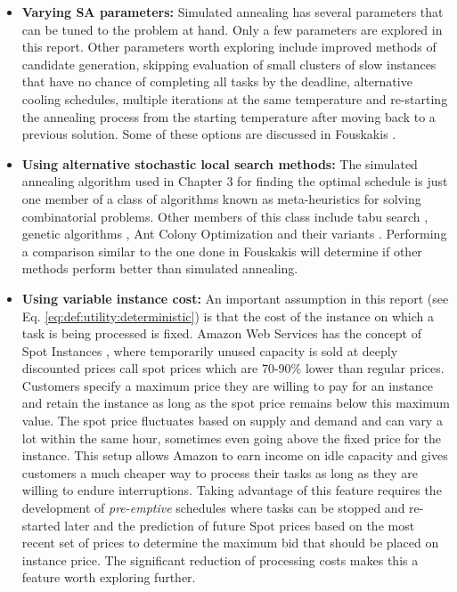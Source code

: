 \documentclass[12pt]{report}
\begin{document}
\begin{itemize}

	\item \textbf{Varying SA parameters:} Simulated annealing has several parameters that can be tuned to the problem at hand.
	Only a few parameters are explored in this report.
	Other parameters worth exploring include improved methods of candidate generation, skipping evaluation of small clusters of slow instances that have no chance of completing all tasks by the deadline, alternative cooling schedules, multiple iterations at the same temperature and re-starting the annealing process from the starting temperature after moving back to a previous solution. 
	Some of these options are discussed in Fouskakis \cite{Fouskakis2001}.
	
	\item \textbf{Using alternative stochastic local search methods:} 
	The simulated annealing algorithm \cite{Kirkpatrick1983} used in Chapter 3 for finding the optimal schedule is just one member of a class of algorithms known as meta-heuristics for solving combinatorial problems.
	Other members of this class include tabu search \cite{Glover1989, Glover1990}, genetic algorithms \cite{Holland1992}, Ant Colony Optimization \cite{Dorigo2006} and their variants \cite{Hoos2004}.
	Performing a comparison similar to the one done in Fouskakis \cite{Fouskakis2001} will determine if other methods perform better than simulated annealing.
	
	\item \textbf{Using variable instance cost:} An important assumption in this report (see Eq. \ref{eq:def:utility:deterministic}) is that the cost of the instance on which a task is being processed is fixed.
		Amazon Web Services has the concept of Spot Instances \cite{AWS:Spot}, where temporarily unused capacity is sold at deeply discounted prices call spot prices which are 70-90\% lower than regular prices.
		Customers specify a maximum price they are willing to pay for an instance and retain the instance as long as the spot price remains below this maximum value.
		The spot price fluctuates based on supply and demand and can vary a lot within the same hour, sometimes even going above the fixed price for the instance.
		This setup allows Amazon to earn income on idle capacity and gives customers a much cheaper way to process their tasks as long as they are willing to endure interruptions.
		Taking advantage of this feature requires the development of \textit{pre-emptive} schedules where tasks can be stopped and re-started later and the prediction of future Spot prices based on the most recent set of prices to determine the maximum bid that should be placed on instance price.
		The significant reduction of processing costs makes this a feature worth exploring further.
	
\end{itemize}


\newpage
\sloppy
\printbibliography

\appendix

\end{document}
